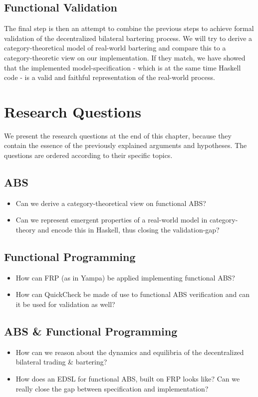 \subsection{Functional Validation}
The final step is then an attempt to combine the previous steps to achieve formal validation of the decentralized bilateral bartering process. We will try to derive a category-theoretical model of real-world bartering and compare this to a category-theoretic view on our implementation. If they match, we have showed that the implemented model-specification - which is at the same time Haskell code - is a valid and faithful representation of the real-world process.

\section{Research Questions}
We present the research questions at the end of this chapter, because they contain the essence of the previously explained arguments and hypotheses. The questions are ordered according to their specific topics.

\subsection{ABS}
\begin{itemize}
	\item Can we derive a category-theoretical view on functional ABS? 
	\item Can we represent emergent properties of a real-world model in category-theory and encode this in Haskell, thus closing the validation-gap?
\end{itemize}

\subsection{Functional Programming}
\begin{itemize}
	\item How can FRP (as in Yampa) be applied implementing functional ABS?
	\item How can QuickCheck be made of use to functional ABS verification and can it be used for validation as well?
\end{itemize}

\subsection{ABS \& Functional Programming}
\begin{itemize}
	\item How can we reason about the dynamics and equilibria of the decentralized bilateral trading \& bartering?
	\item How does an EDSL for functional ABS, built on FRP looks like? Can we really close the gap between specification and implementation?
\end{itemize}